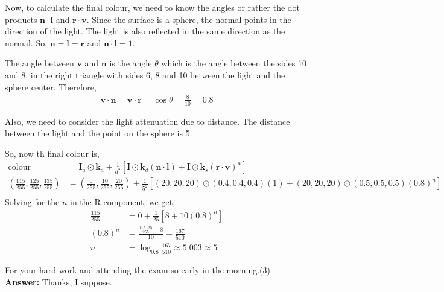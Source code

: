 \documentclass[11pt,answers]{exam}
\begin{document}
\begin{questions}
\begin{center}
\end{center}

Now, to calculate the final colour, we need to know the angles or rather the dot products $\mathbf{n} \cdot \mathbf{l}$ and $\mathbf{r} \cdot \mathbf{v}$.
Since the surface is a sphere, the normal points in the direction of the light. The light is also reflected in the same direction as the normal.
So, $\mathbf{n} = \mathbf{l} = \mathbf{r}$ and $\mathbf{n} \cdot \mathbf{l} = 1$.

The angle between $\mathbf{v}$ and $\mathbf{n}$ is the angle $\theta$ which is the angle between the sides 10 and 8, in the right triangle with sides 6, 8 and 10 between
the light and the sphere center. Therefore,
\begin{align*}
\mathbf{v} \cdot \mathbf{n} = \mathbf{v} \cdot \mathbf{r} = \cos \theta = \frac{8}{10} = 0.8
\end{align*}

Also, we need to consider the light attenuation due to distance. The distance between the light and the point on the sphere is 5.

So, now th final colour is,
\begin{align*}
\text{colour} &= \mathbf{I}_a \odot \mathbf{k}_a + \frac{1}{d^2} \left[ \mathbf{I} \odot \mathbf{k}_d (\mathbf{n} \cdot \mathbf{l}) + \mathbf{I} \odot \mathbf{k}_s (\mathbf{r} \cdot \mathbf{v})^n \right] \\
\left(\frac{115}{255},\frac{125}{255},\frac{135}{255}\right) &= \left(\frac{0}{255},\frac{10}{255},\frac{20}{255}\right) + \frac{1}{5^2} \left[ (20, 20, 20) \odot (0.4, 0.4, 0.4) (1) + (20, 20, 20) \odot (0.5, 0.5, 0.5) (0.8)^n \right] \\
\end{align*}
Solving for the $n$ in the R component, we get,
\begin{align*}
\frac{115}{255} &= 0 + \frac{1}{25} \left[ 8 + 10 (0.8)^n \right] \\
(0.8)^n &= \frac{\frac{115 \cdot 25}{255} - 8 }{ 10} = \frac{167}{510} \\
n &= \log_{0.8} \frac{167}{510}\approx 5.003 \approx 5
\end{align*}

\question[]For your hard work and attending the exam so early in the morning.\hfill (3) \\
\textbf{Answer:} Thanks, I suppose.
\end{questions}
\end{document}
